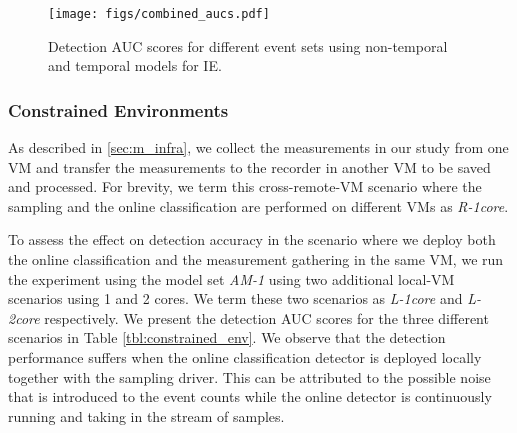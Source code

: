 \documentclass{acm_proc_article-sp}
\begin{document}
\begin{figure}
  \centering
  \texttt{[image: figs/combined\_aucs.pdf]}
  \caption{Detection AUC scores for different event sets using non-temporal and temporal models for IE.}
  \label{fig:combined_aucs}
\end{figure}

\subsubsection{Constrained Environments}
As described in \ref{sec:m_infra}, we collect the measurements in our study from one VM and transfer the measurements to the recorder in another VM to be saved and processed. For brevity, we term this cross-remote-VM scenario where the sampling and the online classification are performed on different VMs as \textit{R-1core}.

To assess the effect on detection accuracy in the scenario where we deploy both the online classification and the measurement gathering in the same VM, we run the experiment using the model set \textit{AM-1} using two additional local-VM scenarios using 1 and 2 cores. We term these two scenarios as \textit{L-1core} and \textit{L-2core} respectively. We present the detection AUC scores for the three different scenarios in Table \ref{tbl:constrained_env}. We observe that the detection performance suffers when the online classification detector is deployed locally together with the sampling driver. This can be attributed to the possible noise that is introduced to the event counts while the online detector is continuously running and taking in the stream of samples.

\begin{table}
\caption{AUC scores for constrained scenarios using set \textit{AM-1}.}
\label{tbl:constrained_env}
\end{table}
\end{document}

